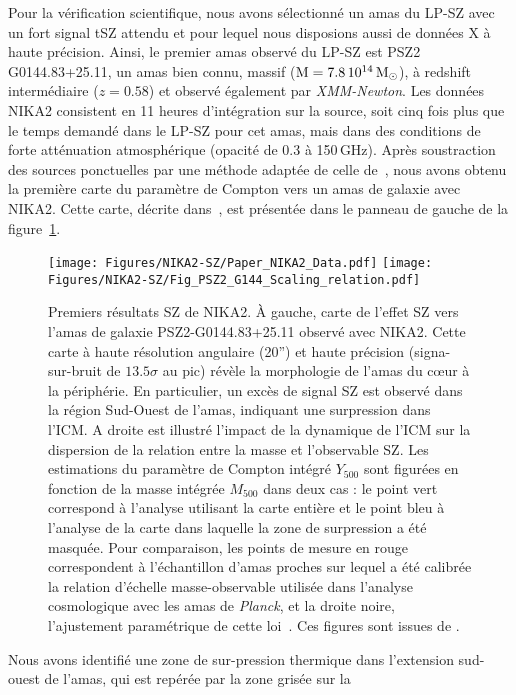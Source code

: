 Pour la vérification scientifique, nous avons sélectionné un amas du
LP-SZ avec un fort signal tSZ attendu et pour lequel nous disposions
aussi de données X à haute précision. Ainsi, le premier amas observé
du LP-SZ est PSZ2\,G0144.83+25.11, un amas bien connu, massif
($\rm{M} = 7.8\,10^{14}\,\rm{M}_{\odot}$), à redshift intermédiaire
($z=0.58$) et observé également par \emph{XMM-Newton}. Les données
NIKA2 consistent en 11 heures d'intégration sur la source, soit cinq
fois plus que le temps demandé dans le LP-SZ pour cet amas, mais dans
des conditions de forte atténuation atmosphérique (opacité de 0.3 à
150\,GHz). Après soustraction des sources ponctuelles par une méthode
adaptée de celle de~\citet{Adam2016}, nous avons
obtenu la première carte du paramètre de Compton vers un amas de
galaxie avec NIKA2. Cette carte, décrite dans~\citet{Ruppin2018}, est
présentée dans le panneau de gauche de la figure~\ref{fig:nika2-sz}.
%
\begin{figure}
  \centering
  \texttt{[image: Figures/NIKA2-SZ/Paper\_NIKA2\_Data.pdf]}
  \texttt{[image: Figures/NIKA2-SZ/Fig\_PSZ2\_G144\_Scaling\_relation.pdf]}
  \caption{Premiers résultats SZ de NIKA2. \`A gauche, carte de l'effet SZ vers l'amas de galaxie PSZ2-G0144.83+25.11 observé avec NIKA2. Cette carte à haute résolution angulaire (20'') et haute précision (signa-sur-bruit de $13.5\sigma$ au pic) révèle la morphologie de l'amas du cœur à la périphérie. En particulier, un excès de signal SZ est observé dans la région Sud-Ouest de l'amas, indiquant une surpression dans l'ICM. A droite est illustré l'impact de la dynamique de l'ICM sur la dispersion de la relation entre la masse et l'observable SZ. Les estimations du paramètre de Compton intégré $Y_{500}$ sont figurées en fonction de la masse intégrée $M_{500}$ dans deux cas : le point vert correspond à l'analyse utilisant la carte entière et le point bleu à l'analyse de la carte dans laquelle la zone de surpression a été masquée. Pour comparaison, les points de mesure en rouge correspondent à l'échantillon d'amas proches sur lequel a été calibrée la relation d'échelle masse-observable utilisée dans l'analyse cosmologique avec les amas de \emph{Planck}, et la droite noire, l'ajustement paramétrique de cette loi~\citep{Planck_2014_SZ_Cosmo,Planck_2016_SZ_cosmo}. Ces figures sont issues de \citet{Ruppin2018}.}
  \label{fig:nika2-sz}
\end{figure}
%
Nous avons identifié une zone de sur-pression thermique dans l'extension sud-ouest
de l'amas, qui est repérée par la zone grisée sur la
